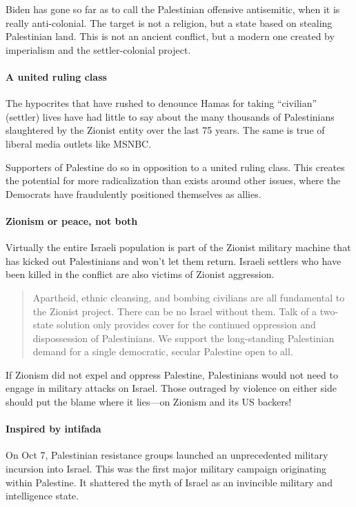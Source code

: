 Biden has gone so far as to call the Palestinian offensive antisemitic, when it is really anti-colonial. The target is not a religion, but a state based on stealing Palestinian land. This is not an ancient conflict, but a modern one created by imperialism and the settler-colonial project.

\paragraph{A united ruling class}

The hypocrites that have rushed to denounce Hamas for taking ``civilian'' (settler) lives have had little to say about the many thousands of Palestinians slaughtered by the Zionist entity over the last 75 years. The same is true of liberal media outlets like MSNBC.

Supporters of Palestine do so in opposition to a united ruling class. This creates the potential for more radicalization than exists around other issues, where the Democrats have fraudulently positioned themselves as allies.

\paragraph{Zionism or peace, not both}

Virtually the entire Israeli population is part of the Zionist military machine that has kicked out Palestinians and won't let them return. Israeli settlers who have been killed in the conflict are also victims of Zionist aggression.

\blockquote{Apartheid, ethnic cleansing, and bombing civilians are all fundamental to the Zionist project. There can be no Israel without them. Talk of a two-state solution only provides cover for the continued oppression and dispossession of Palestinians. We support the long-standing Palestinian demand for a single democratic, secular Palestine open to all.}

If Zionism did not expel and oppress Palestine, Palestinians would not need to engage in military attacks on Israel. Those outraged by violence on either side should put the blame where it lies---on Zionism and its US backers!

\paragraph{Inspired by intifada}

On Oct 7, Palestinian resistance groups launched an unprecedented military incursion into Israel. This was the first major military campaign originating within Palestine. It shattered the myth of Israel as an invincible military and intelligence state.

